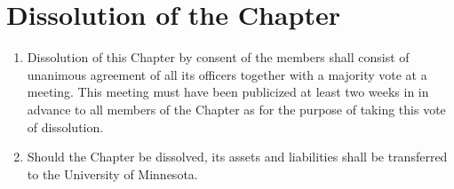 \section{Dissolution of the Chapter}
\begin{enumerate}
	\item Dissolution of this Chapter by consent of the members shall consist of unanimous agreement of all its officers together with a majority vote at a meeting. This meeting must have been publicized at least two weeks in in advance to all members of the Chapter as for the purpose of taking this vote of dissolution.
	\item Should the Chapter be dissolved, its assets and liabilities shall be transferred to the University of Minnesota.

\end{enumerate}



